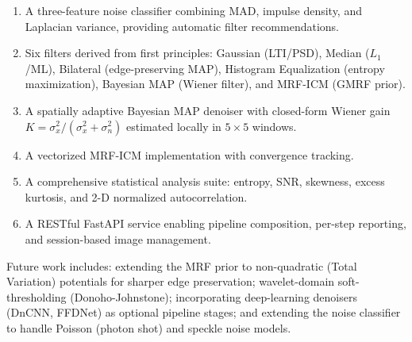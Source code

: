 \documentclass[10pt,conference]{IEEEtran}
\begin{document}
\begin{enumerate}
\item A three-feature noise classifier combining MAD, impulse density, and Laplacian variance, providing automatic filter recommendations.
\item Six filters derived from first principles: Gaussian (LTI/PSD), Median ($L_1$/ML), Bilateral (edge-preserving MAP), Histogram Equalization (entropy maximization), Bayesian MAP (Wiener filter), and MRF-ICM (GMRF prior).
\item A spatially adaptive Bayesian MAP denoiser with closed-form Wiener gain $K = \sigma_x^2/(\sigma_x^2+\sigma_n^2)$ estimated locally in $5\times5$ windows.
\item A vectorized MRF-ICM implementation with convergence tracking.
\item A comprehensive statistical analysis suite: entropy, SNR, skewness, excess kurtosis, and 2-D normalized autocorrelation.
\item A RESTful FastAPI service enabling pipeline composition, per-step reporting, and session-based image management.
\end{enumerate}

Future work includes: extending the MRF prior to non-quadratic (Total Variation) potentials for sharper edge preservation; wavelet-domain soft-thresholding (Donoho-Johnstone); incorporating deep-learning denoisers (DnCNN, FFDNet) as optional pipeline stages; and extending the noise classifier to handle Poisson (photon shot) and speckle noise models.
\end{document}
